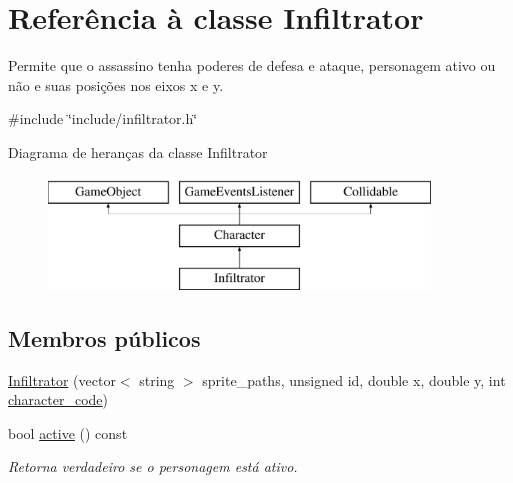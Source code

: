 \hypertarget{classInfiltrator}{}\section{Referência à classe Infiltrator}
\label{classInfiltrator}


Permite que o assassino tenha poderes de defesa e ataque, personagem ativo ou não e suas posições nos eixos x e y.  




{\ttfamily \#include \char`\"{}include/infiltrator.\+h\char`\"{}}

Diagrama de heranças da classe Infiltrator\begin{figure}[H]
\begin{center}
\leavevmode
\includegraphics[height=3.000000cm]{classInfiltrator}
\end{center}
\end{figure}
\subsection*{Membros públicos}
\begin{DoxyCompactItemize}
\item 
\mbox{\hyperlink{classInfiltrator_a1eb1e0a0acf4451da046fa0e8381a1a3}{Infiltrator}} (vector$<$ string $>$ sprite\+\_\+paths, unsigned id, double x, double y, int \mbox{\hyperlink{classCharacter_a3e16e9cb23edc78d774cf30925242a8e}{character\+\_\+code}})
\item 
bool \mbox{\hyperlink{classInfiltrator_ae423f60190c1df91dcccb7e313845171}{active}} () const
\begin{DoxyCompactList}\small\item\em Retorna verdadeiro se o personagem está ativo. \end{DoxyCompactList}\end{DoxyCompactItemize}
